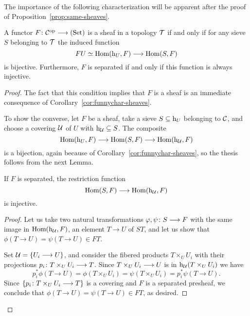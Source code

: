\begin{2   CONTRAVARIANT FUNCTORS}
\begin{2.3 Sheaves in Grothendieck topologies}
The importance of the following characterization will be apparent after the proof of Proposition~\ref{prop:same-sheaves}.

\begin{proposition}\label{prop:funnychar-sheaves}
A functor $F \colon \cC\op \arr \catset$ is a sheaf in a topology $\mathcal{T}$ if and only if for any sieve $S$ belonging to $\mathcal{T}$ the induced function
   \[
   FU \simeq \hom(\h_U, F) \arr  \hom(S, F)
   \]
is bijective. Furthermore, $F$ is separated if and only if this function is always injective.
\end{proposition}

\begin{proof}
The fact that this condition implies that $F$ is a sheaf is an immediate consequence of Corollary~\ref{cor:funnychar-sheaves}.

To show the converse, let $F$ be a sheaf, take a sieve $S \subseteq \mathrm{h}_{U}$ belonging to $\mathcal{C}$, and choose a covering $\mathcal{U}$ of $U$ with $\mathrm{h}_{\mathcal{U}} \subseteq S$. The composite
   \[
   \hom(\h_{U}, F) \arr \hom(S, F) \arr \hom(\h_{\cU}, F)
   \]
is a bijection, again because of Corollary~\ref{cor:funnychar-sheaves}, so the thesis follows from the next Lemma.

\begin{lemma}\label{lem:separated->injective}
If $F$ is separated, the restriction function
   \[
   \hom(S, F) \arr \hom(\h_{\cU}, F)
   \]
is injective.
\end{lemma}

\begin{proof}
Let us take two natural transformations $\phi, \psi \colon S \arr F$ with the same image in $\operatorname{Hom}(\mathrm{h}_{\mathcal{U}}, F)$, an element $T \to U$ of $ST$, and let us show that $\phi(T \to U) = \psi(T \to U) \in FT$.

Set $\mathcal{U} = \{U_{i} \longrightarrow U\}$, and consider the fibered products $T \times_{U} U_{i}$ with their projections $p_{i}\colon T \times_{U} U_{i} \arr T$. Since $T \times_{U} U_{i} \arr U$ is in $\mathrm{h}_{\mathcal{U}}(T \times_{U} U_{i})$ we have
   \[
   p_{i}^{*}\phi(T \to U) = \phi(T \times_{U} U_{i}) = 
   \psi(T \times_{U} U_{i}) = p_{i}^{*}\psi(T \to U).
   \]
Since $\{p_{i}\colon T \times_{U} U_{i} \arr T\}$ is a covering and $F$ is a separated presheaf, we conclude that $\phi(T \to U) = \psi(T \to U) \in FT$, as desired.
\end{proof}


\end{proof}
\end{2.3 Sheaves in Grothendieck topologies}
\end{2   CONTRAVARIANT FUNCTORS}
